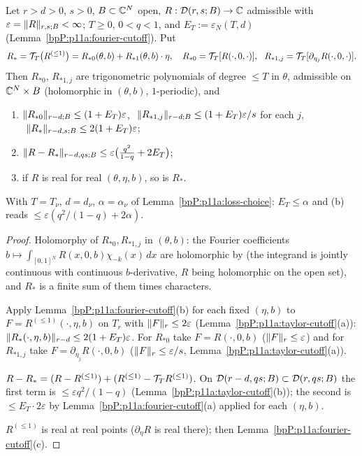\begin{proposition}\label{bpP:p11a:cutoff}
Let $r>d>0$, $s>0$, $B\subset\mathbb{C}^N$ open, $R:\mathcal D(r,s;B)\to\mathbb{C}$ admissible with $\varepsilon=\lVert R\rVert_{r,s;B}<\infty$; $T\ge0$, $0<q<1$, and $E_T:=\varepsilon_N(T,d)$ (Lemma~\ref{bpP:p11a:fourier-cutoff}). Put
\[R_*=\cut_T\bigl(R^{(\le1)}\bigr)=R_{*0}(\theta,b)+R_{*1}(\theta,b)\cdot\eta,\quad R_{*0}=\cut_T[R(\cdot,0,\cdot)],\ \ R_{*1,j}=\cut_T[\partial_{\eta_j}R(\cdot,0,\cdot)].\]
Then $R_{*0}$, $R_{*1,j}$ are trigonometric polynomials of degree $\le T$ in $\theta$, admissible on $\mathbb{C}^N\times B$ (holomorphic in $(\theta,b)$, $1$-periodic), and
\begin{enumerate}[label=(\alph*)]
\item $\lVert R_{*0}\rVert_{r-d;B}\le(1+E_T)\varepsilon$, $\ \nrm{R_{*1,j}}{r-d;B}\le(1+E_T)\varepsilon/s$ for each $j$, $\ \nrm{R_*}{r-d,s;B}\le2(1+E_T)\varepsilon$;
\item $\lVert R-R_*\rVert_{r-d,qs;B}\le\varepsilon\bigl(\frac{q^2}{1-q}+2E_T\bigr)$;
\item if $R$ is real for real $(\theta,\eta,b)$, so is $R_*$.
\end{enumerate}
With $T=T_\nu$, $d=d_\nu$, $\alpha=\alpha_\nu$ of Lemma~\ref{bpP:p11a:loss-choice}: $E_T\le\alpha$ and (b) reads $\le\varepsilon(q^2/(1-q)+2\alpha)$.
\end{proposition}
\begin{proof}
\label{stepP:p11a:cu-coeff} Holomorphy of $R_{*0},R_{*1,j}$ in $(\theta,b)$: the Fourier coefficients $b\mapsto\int_{[0,1]^N}R(x,0,b)\chi_{-k}(x)\,dx$ are holomorphic by  (the integrand is jointly continuous with continuous $b$-derivative, $R$ being holomorphic on the open set), and $R_*$ is a finite sum of them times characters.

\label{stepP:p11a:cu-a} Apply Lemma~\ref{bpP:p11a:fourier-cutoff}(b) for each fixed $(\eta,b)$ to $F=R^{(\le1)}(\cdot,\eta,b)$ on $T_r$ with $\lVert F\rVert_{r}\le2\varepsilon$ (Lemma~\ref{bpP:p11a:taylor-cutoff}(a)): $\lVert R_*(\cdot,\eta,b)\rVert_{r-d}\le2(1+E_T)\varepsilon$. For $R_{*0}$ take $F=R(\cdot,0,b)$ ($\lVert F\rVert_{r}\le\varepsilon$) and for $R_{*1,j}$ take $F=\partial_{\eta_j}R(\cdot,0,b)$ ($\lVert F\rVert_{r}\le\varepsilon/s$, Lemma~\ref{bpP:p11a:taylor-cutoff}(a)).

\label{stepP:p11a:cu-b} $R-R_*=(R-R^{(\le1)})+(R^{(\le1)}-\mathcal T_TR^{(\le1)})$. On $\mathcal D(r-d,qs;B)\subset\mathcal D(r,qs;B)$ the first term is $\le\varepsilon q^2/(1-q)$ (Lemma~\ref{bpP:p11a:taylor-cutoff}(b)); the second is $\le E_T\cdot2\varepsilon$ by Lemma~\ref{bpP:p11a:fourier-cutoff}(a) applied for each $(\eta,b)$.

\label{stepP:p11a:cu-c} $R^{(\le1)}$ is real at real points ($\partial_\eta R$ is real there); then Lemma~\ref{bpP:p11a:fourier-cutoff}(c).
\end{proof}

